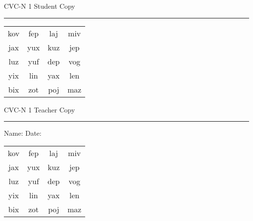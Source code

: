 \documentclass{memoir}
\begin{document}

\footnotesize \noindent
CVC-N 1 \hfill Student Copy
\smallskip
\hrule

\Large

\setlength{\tabcolsep}{14pt}
\def\arraystretch{2}

{\selectfont


\begin{vplace}[0.5]
\begin{center}
\begin{tabular}{cccc}
kov & fep & laj & miv \\
jax & yux & kuz & jep \\
luz & yuf & dep & vog \\
yix & lin & yax & len \\
bix & zot & poj & maz \\
\end{tabular}
\end{center}
\end{vplace}

}

\newpage

\footnotesize \noindent
CVC-N 1 \hfill Teacher Copy
\smallskip
\hrule

\small

\vfill

\noindent
Name: \underline{\hspace{1.75in}} \hfill Date: \underline{\hspace{1in}}

\Large

{\selectfont


\begin{vplace}[0.5]
\begin{center}
\begin{tabular}{cccc}
kov & fep & laj & miv \\
jax & yux & kuz & jep \\
luz & yuf & dep & vog \\
yix & lin & yax & len \\
bix & zot & poj & maz \\
\end{tabular}
\end{center}
\end{vplace}



}
\end{document}
